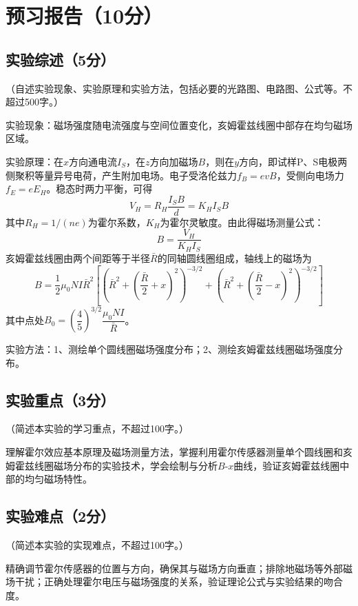 \documentclass{Preport}
\begin{document}
\setcounter{page}{1}
\makecover

\section{预习报告（10分）}
\subsection{实验综述（5分）}
（自述实验现象、实验原理和实验方法，包括必要的光路图、电路图、公式等。不超过500字。）

实验现象：磁场强度随电流强度与空间位置变化，亥姆霍兹线圈中部存在均匀磁场区域。

实验原理：在$x$方向通电流$I_S$，在$z$方向加磁场$B$，则在$y$方向，即试样P、S电极两侧聚积等量异号电荷，产生附加电场。电子受洛伦兹力$f_B=evB$，受侧向电场力$f_E=eE_H$。稳态时两力平衡，可得
\begin{equation}
    V_H = R_H \frac{I_S B}{d} = K_H I_S B
\end{equation}
其中$R_H=1/(ne)$为霍尔系数，$K_H$为霍尔灵敏度。由此得磁场测量公式：
\begin{equation}
    B = \frac{V_H}{K_H I_S}
\end{equation}
亥姆霍兹线圈由两个间距等于半径$\bar{R}$的同轴圆线圈组成，轴线上的磁场为
\begin{equation}
    B = \frac{1}{2}\mu_0 N I \bar{R}^2 \left[\left(\bar{R}^2 + \left(\frac{\bar{R}}{2}+x\right)^2\right)^{-3/2} + \left(\bar{R}^2 + \left(\frac{\bar{R}}{2}-x\right)^2\right)^{-3/2}\right]
\end{equation}
其中点处$B_0 = \left(\dfrac{4}{5}\right)^{3/2} \dfrac{\mu_0 N I}{\bar{R}}$。

实验方法：1、测绘单个圆线圈磁场强度分布；2、测绘亥姆霍兹线圈磁场强度分布。

\subsection{实验重点（3分）}
（简述本实验的学习重点，不超过100字。）

理解霍尔效应基本原理及磁场测量方法，掌握利用霍尔传感器测量单个圆线圈和亥姆霍兹线圈磁场分布的实验技术，学会绘制与分析$B$-$x$曲线，验证亥姆霍兹线圈中部的均匀磁场特性。

\subsection{实验难点（2分）}
（简述本实验的实现难点，不超过100字。）

精确调节霍尔传感器的位置与方向，确保其与磁场方向垂直；排除地磁场等外部磁场干扰；正确处理霍尔电压与磁场强度的关系，验证理论公式与实验结果的吻合度。


\end{document}
